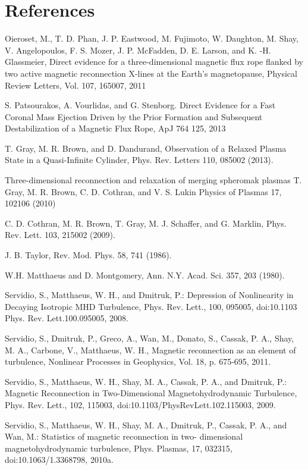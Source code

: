 \documentclass[12pt]{iopart}
\begin{document}
\section*{References}
\begin{thebibliography}{10}
Oieroset, M., T. D. Phan, J. P. Eastwood, M. Fujimoto, W. Daughton, M. Shay, V. Angelopoulos, F. S. Mozer, J. P. McFadden, D. E. Larson, and K. -H. Glassmeier, Direct evidence for a three-dimensional magnetic flux rope flanked by two active magnetic reconnection X-lines at the Earth's magnetopause, Physical Review Letters, Vol. 107, 165007, 2011

S. Patsourakos, A. Vourlidas, and G. Stenborg. Direct Evidence for a Fast Coronal Mass Ejection Driven by the Prior Formation and Subsequent Destabilization of a Magnetic Flux Rope,
ApJ 764 125, 2013

T. Gray, M. R. Brown, and D. Dandurand, Observation of a Relaxed Plasma State in a Quasi-Infinite Cylinder, Phys. Rev. Letters 110, 085002 (2013). 

Three-dimensional reconnection and relaxation of merging spheromak plasmas 
T. Gray, M. R. Brown, C. D. Cothran, and V. S. Lukin 
Physics of Plasmas 17, 102106 (2010)

C. D. Cothran, M. R. Brown, T. Gray, M. J. Schaffer, and
G. Marklin, Phys. Rev. Lett. 103, 215002 (2009).

 J. B. Taylor, Rev. Mod. Phys. 58, 741 (1986).

 W.H. Matthaeus and D. Montgomery, Ann. N.Y. Acad. Sci. 357, 203 (1980).

Servidio, S., Matthaeus, W. H., and Dmitruk, P.: Depression of Nonlinearity in Decaying Isotropic MHD Turbulence, Phys. Rev. Lett., 100, 095005, doi:10.1103 Phys. Rev. Lett.100.095005, 2008.

Servidio, S., Dmitruk, P., Greco, A., Wan, M., Donato, S., Cassak, P. A., Shay, M. A., Carbone, V., Matthaeus, W. H., Magnetic reconnection as an element of turbulence, Nonlinear Processes in Geophysics, Vol. 18, p. 675-695, 2011. 

Servidio, S., Matthaeus, W. H., Shay, M. A., Cassak, P. A., and Dmitruk, P.: Magnetic Reconnection in Two-Dimensional Magnetohydrodynamic Turbulence, Phys. Rev. Lett., 102, 115003, doi:10.1103/PhysRevLett.102.115003, 2009.

Servidio, S., Matthaeus, W. H., Shay, M. A., Dmitruk, P., Cassak, P. A., and Wan, M.: Statistics of magnetic reconnection in two- dimensional magnetohydrodynamic turbulence, Phys. Plasmas, 17, 032315, doi:10.1063/1.3368798, 2010a.


\end{thebibliography}
\end{document}

